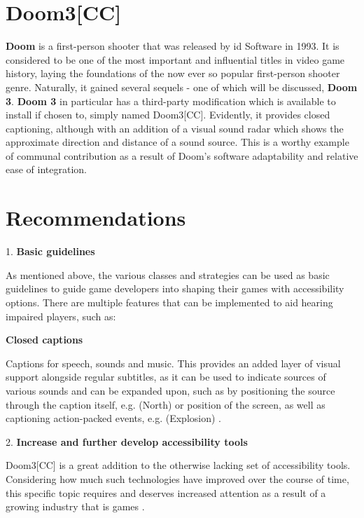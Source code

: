 \documentclass{scrartcl}
\begin{document}
\section{Doom3[CC]}
\textbf{Doom} is a first-person shooter that was released by id Software in 1993. It is considered to be one of the most important and influential titles in video game history, laying the foundations of the now ever so popular first-person shooter genre. Naturally, it gained several sequels - one of which will be discussed, \textbf{Doom 3}. \textbf{Doom 3} in particular has a third-party modification which is available to install if chosen to, simply named Doom3[CC]. Evidently, it provides closed captioning, although with an addition of a visual sound radar which shows the approximate direction and distance of a sound source. This is a worthy example of communal contribution as a result of Doom's software adaptability and relative ease of integration. 


\section{Recommendations}


\hspace{6mm}1.	\textbf{Basic guidelines}

\hspace{-4mm}As mentioned above, the various classes and strategies can be used as basic guidelines to guide game developers into shaping their games with accessibility options. There are multiple features that can be implemented to aid hearing impaired players, such as:

\hspace{-4mm}\textbf{Closed captions}

\hspace{-4mm}Captions for speech, sounds and music. This provides an added layer of visual support alongside regular subtitles, as it can be used to indicate sources of various sounds and can be expanded upon, such as by positioning the source through the caption itself, e.g. (North) or position of the screen, as well as captioning action-packed events, e.g. (Explosion) \cite{Yuan}.

2.	\textbf{Increase and further develop accessibility tools}

\hspace{-4mm}Doom3[CC] is a great addition to the otherwise lacking set of accessibility tools. Considering how much such technologies have improved over the course of time, this specific topic requires and deserves increased attention as a result of a growing industry that is games \cite{Fromme}.
\end{document}
